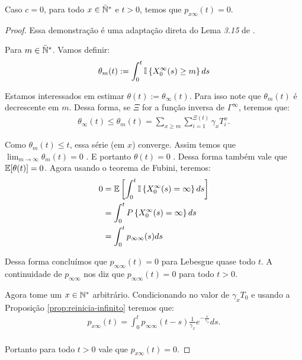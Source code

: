 \begin{proposicao}
  \label{prop:naocontinuidade}
  Caso $c = 0$, para todo $x \in {\mathbb{\bar{N}^*}}$ e $t > 0$, temos que $p_{x
    \infty} (t) = 0$.
\end{proposicao}
\begin{proof}
  Essa demonstração é uma adaptação direta do Lema \emph{3.15} de
  \cite{fontes:08}.

  Para $m \in {\mathbb{\bar{N}^*}}$. Vamos definir:
  \begin{align*}
    \theta_m(t) := \int_0^t {\mathbb{I}} \left\{ X^\infty_0(s) \geq m \right\} ds
  \end{align*}

  Estamos interessados em estimar $\theta(t) :=
  \theta_\infty(t)$. Para isso note que $\theta_m(t)$ é decrescente em
  $m$. Dessa forma, se $\Xi$ for a função inversa de $\Gamma^\infty$, teremos
  que:
  \begin{align*}
    \theta_\infty(t) \leq \theta_m(t) = \sum_{x \geq m}
    \sum_{i=1}^{\Xi(t)} \gamma_x T^x_i.
  \end{align*}


  Como $\theta_m(t) \leq t$, essa série (em $x$) converge. Assim temos
  que $\lim_{m\to\infty} \theta_m(t) = 0$ \qc. E portanto $\theta(t) =
  0$ \qc. Dessa forma também vale que ${\mathbb{E}}[\theta(t)] = 0$. Agora
  usando o teorema de Fubini, teremos:
  \begin{align*}
    0 &= {\mathbb{E}}\left[ \int_0^t {\mathbb{I}} \left\{ X^\infty_0(s) = \infty
      \right\} ds \right]\\
    &= \int_0^t P \left\{ X^\infty_0(s) = \infty
    \right\} ds\\
    &= \int_0^t p_{\infty \infty} (s) ds
  \end{align*}

  Dessa forma concluímos que $p_{\infty \infty} (t) = 0$ para Lebesgue
  quase todo $t$. A continuidade de $p_{\infty \infty}$ nos diz que
  $p_{\infty \infty}(t) = 0$ para todo $t > 0$.

  Agora tome um $x \in {\mathbb{N^*}}$ arbitrário. Condicionando no valor de
  $\gamma_x T_0$ e usando a Proposição \ref{prop:reinicia-infinito}
  teremos que:
  \begin{align*}
    p_{x \infty} (t) = \int_0^t p_{\infty \infty} (t-s)
    \frac{1}{\gamma_x}e^{-\frac{s}{\gamma_x}} ds.\\
  \end{align*}

  Portanto para todo $t > 0$ vale que $p_{x \infty} (t) = 0$.


\end{proof}


